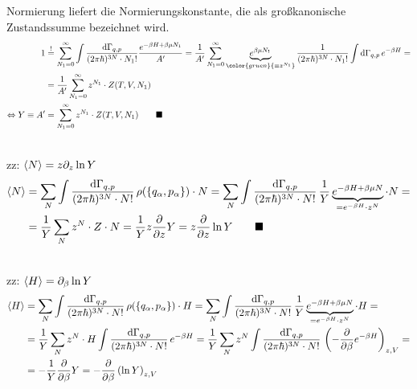 \documentclass{article}
\newcommand{\diff}{\mathrm{d}}
\newcommand{\lr}[1]{\left(#1\right)}
\newcommand{\comment}[1]{{\color{gruen} {#1}}}
\begin{document}
{	Normierung liefert die Normierungskonstante, die als großkanonische Zustandssumme bezeichnet wird.
		\begin{align*}
			1 &\stackrel{!}{=} \sum_{N_1=0}^\infty \int \frac{\diff\Gamma_{q,p}}{(2\pi\hbar)^{3N}\cdot N_1!} \frac{e^{-\beta H + \beta\mu N_1}}{A'} = \frac{1}{A'} \sum_{N_1=0}^\infty \underbrace{e^{\beta\mu N_1}}_{\comment{\equiv z^{N_1}}} \frac{1}{(2\pi\hbar)^{3N}\cdot N_1!} \int \diff\Gamma_{q,p}\, e^{-\beta H} = \\
			&= \frac{1}{A'} \sum_{N_1=0}^\infty z^{N_1} \cdot Z(T,V,N_1) \\
			\Leftrightarrow Y \equiv A' &= \sum_{N_1=0}^\infty z^{N_1} \cdot Z(T,V,N_1) \qquad \blacksquare
		\end{align*}


	\\
	zz: $\braket{N} = z \partial_z \ln Y$
		\begin{align*}
			\braket{N} &= \sum_N \int \frac{\diff\Gamma_{q,p}}{(2\pi\hbar)^{3N} \cdot N!}\, \rho(\{q_\alpha, p_\alpha\}) \cdot N = \sum_N \int \frac{\diff\Gamma_{q,p}}{(2\pi\hbar)^{3N} \cdot N!}\, \frac{1}{Y} \underbrace{e^{-\beta H + \beta\mu N}}_{= e^{-\beta H} \cdot z^N} \cdot N = \\
			&= \frac{1}{Y} \sum_N z^N \cdot Z\cdot N = \frac{1}{Y} z \frac{\partial}{\partial z} Y = z\frac{\partial}{\partial z} \ln Y \qquad \blacksquare
		\end{align*}
	
	
	\\
	zz: $\braket{H} = \partial_\beta \ln Y$
		\begin{align*}
			\braket{H} &= \sum_N \int \frac{\diff\Gamma_{q,p}}{(2\pi\hbar)^{3N} \cdot N!}\, \rho(\{q_\alpha, p_\alpha\}) \cdot H = \sum_N \int \frac{\diff\Gamma_{q,p}}{(2\pi\hbar)^{3N} \cdot N!}\, \frac{1}{Y} \underbrace{e^{-\beta H + \beta\mu N}}_{= e^{-\beta H} \cdot z^N} \cdot H = \\
			&= \frac{1}{Y} \sum_N z^N \cdot H \int \frac{\diff\Gamma_{q,p}}{(2\pi\hbar)^{3N} \cdot N!}\, e^{-\beta H} = \frac{1}{Y} \sum_N z^N  \int \frac{\diff\Gamma_{q,p}}{(2\pi\hbar)^{3N} \cdot N!}\, \lr{-\frac{\partial}{\partial\beta} e^{-\beta H} }_{z,V} = \\
			&= -\frac{1}{Y}\frac{\partial}{\partial \beta}Y = -\frac{\partial}{\partial \beta} \lr{\ln Y}_{z,V}
		\end{align*}


}
\end{document}
